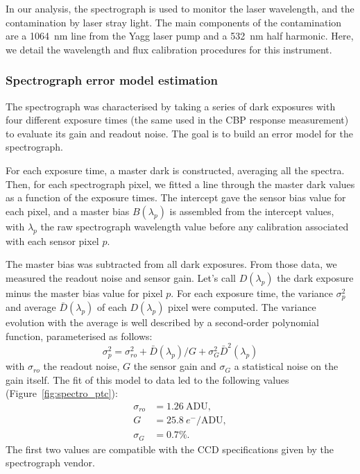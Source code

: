 In our analysis, the spectrograph is used to monitor the laser wavelength, and the contamination by laser stray light. The main components of the contamination are a \SI{1064}{\nm} line from the Yagg laser pump and a \SI{532}{\nm} half harmonic. Here, we detail the wavelength and flux calibration procedures for this instrument.


\subsubsection{Spectrograph error model estimation}

The spectrograph was characterised by taking a series of dark exposures with four different exposure times (the same used in the CBP response measurement) to evaluate its gain and readout noise. The goal is to build an error model for the spectrograph.

For each exposure time, a master dark is constructed, averaging all the spectra. Then, for each spectrograph pixel, we fitted a line through the master dark values as a function of the exposure times. The intercept gave the sensor bias value for each pixel, and a master bias $B(\lambda_p)$ is assembled from the intercept values, with $\lambda_p$ the raw spectrograph wavelength value before any calibration associated with each sensor pixel $p$. 

The master bias was subtracted from all dark exposures. From those data, we measured the readout noise and sensor gain. Let's call $D(\lambda_p)$ the dark exposure minus the master bias value for pixel $p$. For each exposure time, the variance $\sigma_p^2$ and average $\bar{D}(\lambda_p)$ of each $D(\lambda_p)$ pixel were computed. The variance evolution with the average is well described by a second-order polynomial function, parameterised as follows:
\begin{equation}\label{eq:spectro_error_model}
\sigma^2_p =\sigma_{ro}^2 +  \bar{D}(\lambda_p)/G + \sigma_G^2 \bar{D}^2(\lambda_p)
\end{equation}
with $\sigma_{ro}$ the readout noise, $G$ the sensor gain and $\sigma_G$ a statistical noise on the gain itself. The fit of this model to data led to the following values (Figure~\ref{fig:spectro_ptc}):
\begin{align}
    \sigma_{ro} &= 1.26\ \mathrm{ADU}, \\
    G & = 25.8\ e^-/\mathrm{ADU} ,\\
    \sigma_G & = 0.7\%.
\end{align}
The first two values are compatible with the CCD specifications given by the spectrograph vendor. 

